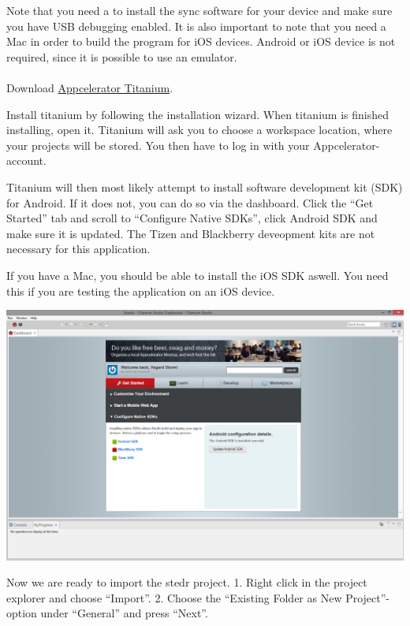 Note that you need a to install the sync software for your device and make sure you have USB debugging enabled. It is also important to note that you need a Mac in order to build the program for iOS devices. Android or iOS device is not required, since it is possible to use an emulator. 

\paragraph{}

Download \href{http://www.appcelerator.com/titanium/}{Appcelerator Titanium}.

Install titanium by following the installation wizard. When titanium is finished installing, open it. Titanium will ask you to choose a workspace location, where your projects will be stored. You then have to log in with your Appcelerator-account.

Titanium will then most likely attempt to install software development kit (SDK) for Android. If it does not, you can do so via the dashboard. Click the “Get Started” tab and scroll to “Configure Native SDKs”, click Android SDK and make sure it is updated. The Tizen and Blackberry deveopment kits are not necessary for this application.

If you have a Mac, you should be able to install the iOS SDK aswell. You need this if you are testing the application on an iOS device.

\begin{center}
\includegraphics[scale=0.3]{guide/f1.png} 
\end{center}

Now we are ready to import the stedr project.
1. Right click in the project explorer and choose “Import”.
2. Choose the “Existing Folder as New Project”-option under “General” and press “Next”.

